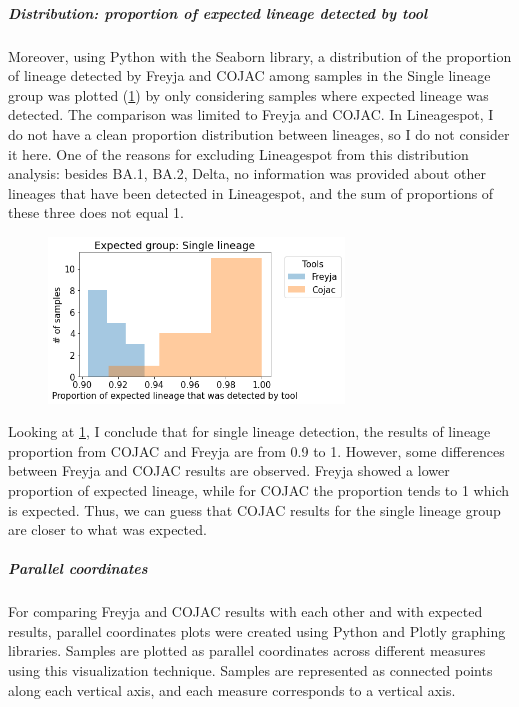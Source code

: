                 \subparagraph{Distribution: proportion of expected lineage detected by tool}
                Moreover, using Python with the Seaborn library, a distribution of the proportion of lineage detected by Freyja and COJAC among samples in the Single lineage group was plotted (\cref{fig:results:mock:dist-singlin}) by only considering samples where expected lineage was detected. The comparison was limited to Freyja and COJAC. In Lineagespot, I do not have a clean proportion distribution between lineages, so I do not consider it here. One of the reasons for excluding Lineagespot from this distribution analysis: besides BA.1, BA.2, Delta, no information was provided about other lineages that have been detected in Lineagespot, and the sum of proportions of these three does not equal 1. 
                \begin{figure}[ht!]
                	\centering
                    \includegraphics[width=0.7\textwidth]{figures/results/mock/dist-singlin-fr-co.png}
                    \label{fig:results:mock:dist-singlin}
                \end{figure}
                Looking at \cref{fig:results:mock:dist-singlin}, I conclude that for single lineage detection, the results of lineage proportion from COJAC and Freyja are from 0.9 to 1. However, some differences between Freyja and COJAC results are observed. Freyja showed a lower proportion of expected lineage, while for COJAC the proportion tends to 1 which is expected. Thus, we can guess that COJAC results for the single lineage group are closer to what was expected.
                
                \subparagraph{Parallel coordinates}
                For comparing Freyja and COJAC results with each other and with expected results, parallel coordinates plots were created using Python and Plotly graphing libraries. Samples are plotted as parallel coordinates across different measures using this visualization technique. Samples are represented as connected points along each vertical axis, and each measure corresponds to a vertical axis. 

